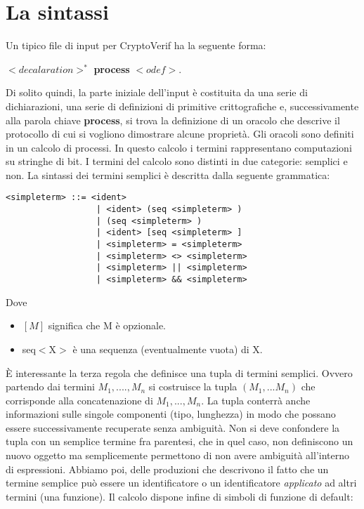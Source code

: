 \documentclass[a4paper,openright,twoside,12pt]{report}
\begin{document}
\section{La sintassi}
Un tipico file di input per CryptoVerif ha la seguente forma: \begin{center}
                                                               $<decalaration>^{*}$ \textbf{process} $<odef>$.
                                                              \end{center}
Di solito quindi, la parte iniziale dell'input \`e costituita da una serie di dichiarazioni, una serie di definizioni di primitive crittografiche e, successivamente alla parola chiave \textbf{process}, 
si trova la definizione di un oracolo che descrive il protocollo di cui si vogliono dimostrare alcune propriet\`a.
Gli oracoli sono definiti in un calcolo di processi. In questo calcolo i termini rappresentano computazioni su stringhe di bit.
I termini del calcolo sono distinti in due categorie: semplici e non. La sintassi dei termini semplici \`e descritta dalla seguente grammatica:
\begin{verbatim}
<simpleterm> ::= <ident>
                  | <ident> (seq <simpleterm> )
                  | (seq <simpleterm> )
                  | <ident> [seq <simpleterm> ]
                  | <simpleterm> = <simpleterm>
                  | <simpleterm> <> <simpleterm>
                  | <simpleterm> || <simpleterm>
                  | <simpleterm> && <simpleterm>
\end{verbatim}
Dove
\begin{itemize}
 \item $[M]$ significa che M \`e opzionale.
 \item seq$<$X$>$ \`e una sequenza (eventualmente vuota) di X.
\end{itemize}
\`E interessante la terza regola che definisce una tupla di termini semplici. Ovvero partendo dai termini $M_1,....,M_n$ si costruisce la tupla $(M_1,...M_n)$ che corrisponde
alla concatenazione di $M_1,...,M_n$. La tupla conterr\`a anche informazioni sulle singole componenti (tipo, lunghezza) in modo che possano essere successivamente 
recuperate senza ambiguit\`a.
Non si deve confondere la tupla con un semplice termine fra parentesi, che in quel caso, non definiscono un nuovo oggetto ma semplicemente 
permettono di non avere ambiguit\`a all'interno di espressioni. Abbiamo poi, delle produzioni che descrivono il fatto che un termine semplice pu\`o essere
un identificatore o un identificatore \emph{applicato} ad altri termini (una funzione). Il calcolo dispone infine di simboli di funzione di default:
\end{document}
